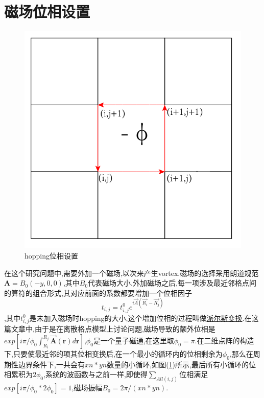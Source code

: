 \documentclass[a4paper,12pt]{ctexart}
\numberwithin{equation}{section}
\begin{document}
\section{磁场位相设置}
\begin{figure}[ht]
\centering
\includegraphics[scale=0.45]{flux2.png}
\caption{hopping位相设置}\label{magnet}
\end{figure}
在这个研究问题中,需要外加一个磁场,以次来产生vortex.磁场的选择采用朗道规范$\mathbf{A}=B_0(-y,0,0)$,其中$B_0$代表磁场大小.外加磁场之后,每一项涉及最近邻格点间的算符的组合形式,其对应前面的系数都要增加一个位相因子$$t_{i,j}=t^0_{i,j}e^{i\vec{A}(\vec{R_i}-\vec{R_j})}$$,其中$t^0_{i,j}$是未加入磁场时hopping的大小,这个增加位相的过程叫做\href{https://zhuanlan.zhihu.com/p/81170343}{派尔斯变换}.在这篇文章中,由于是在离散格点模型上讨论问题,磁场导致的额外位相是$exp[i\pi/\phi_0\int_{R_i}^{R_j}\vec{\mathbf{A}}(\mathbf{r})d\mathbf{r}]$,$\phi_0$是一个量子磁通,在这里取$\phi_0=\pi$.在二维点阵的构造下,只要使最近邻的项其位相变换后,在一个最小的循环内的位相剩余为$\phi_0$,那么在周期性边界条件下,一共会有$xn*yn$数量的小循环,如图(\ref{magnet})所示,最后所有小循环的位相累积为$2\phi_0$,系统的波函数与之前一样,即使得$\sum_{All (i,j)}$位相满足$exp[i\pi/\phi_0*2\phi_0]=1$,磁场振幅$B_0=2\pi/(xn*yn)$.
\end{document}
